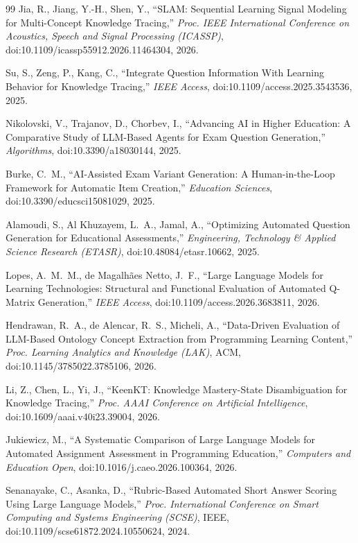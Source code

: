 \documentclass[12pt]{report}
\begin{document}
\begin{thebibliography}{99}
 Jia, R., Jiang, Y.-H., Shen, Y., ``SLAM: Sequential Learning Signal Modeling for Multi-Concept Knowledge Tracing,'' \textit{Proc. IEEE International Conference on Acoustics, Speech and Signal Processing (ICASSP)}, doi:10.1109/icassp55912.2026.11464304, 2026.

 Su, S., Zeng, P., Kang, C., ``Integrate Question Information With Learning Behavior for Knowledge Tracing,'' \textit{IEEE Access}, doi:10.1109/access.2025.3543536, 2025.

 Nikolovski, V., Trajanov, D., Chorbev, I., ``Advancing AI in Higher Education: A Comparative Study of LLM-Based Agents for Exam Question Generation,'' \textit{Algorithms}, doi:10.3390/a18030144, 2025.

 Burke, C.~M., ``AI-Assisted Exam Variant Generation: A Human-in-the-Loop Framework for Automatic Item Creation,'' \textit{Education Sciences}, doi:10.3390/educsci15081029, 2025.

 Alamoudi, S., Al Khuzayem, L.~A., Jamal, A., ``Optimizing Automated Question Generation for Educational Assessments,'' \textit{Engineering, Technology \& Applied Science Research (ETASR)}, doi:10.48084/etasr.10662, 2025.

 Lopes, A.~M.~M., de Magalh\~aes Netto, J.~F., ``Large Language Models for Learning Technologies: Structural and Functional Evaluation of Automated Q-Matrix Generation,'' \textit{IEEE Access}, doi:10.1109/access.2026.3683811, 2026.

 Hendrawan, R.~A., de Alencar, R.~S., Micheli, A., ``Data-Driven Evaluation of LLM-Based Ontology Concept Extraction from Programming Learning Content,'' \textit{Proc. Learning Analytics and Knowledge (LAK)}, ACM, doi:10.1145/3785022.3785106, 2026.

 Li, Z., Chen, L., Yi, J., ``KeenKT: Knowledge Mastery-State Disambiguation for Knowledge Tracing,'' \textit{Proc. AAAI Conference on Artificial Intelligence}, doi:10.1609/aaai.v40i23.39004, 2026.

 Jukiewicz, M., ``A Systematic Comparison of Large Language Models for Automated Assignment Assessment in Programming Education,'' \textit{Computers and Education Open}, doi:10.1016/j.caeo.2026.100364, 2026.

 Senanayake, C., Asanka, D., ``Rubric-Based Automated Short Answer Scoring Using Large Language Models,'' \textit{Proc. International Conference on Smart Computing and Systems Engineering (SCSE)}, IEEE, doi:10.1109/scse61872.2024.10550624, 2024.


\end{thebibliography}
\end{document}
